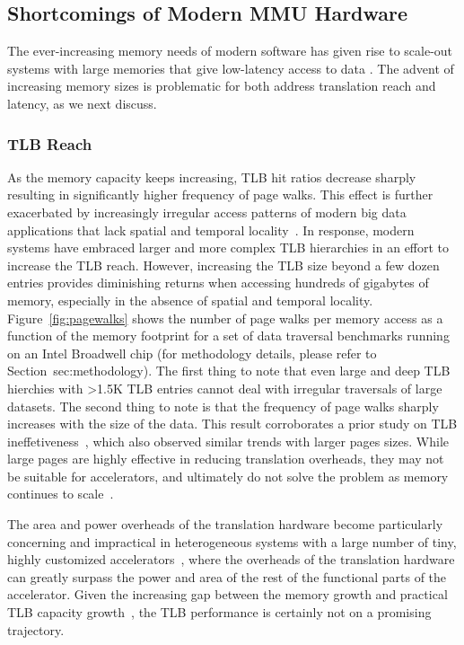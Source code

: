 \subsection{Shortcomings of Modern MMU Hardware}
The ever-increasing memory needs of modern software has given rise to
scale-out systems with large memories that give low-latency access to
data \cite{ferdman:clearing, karakostas:performance, volos:fat,
  basu:efficient}. The advent of increasing memory sizes is
problematic for both address translation reach and latency, as we next
discuss.

\subsubsection{TLB Reach}
As the memory capacity keeps increasing, TLB hit ratios decrease
sharply~\cite{basu:efficient} resulting in significantly higher
frequency of page walks. This effect is further exacerbated by
increasingly irregular access patterns of modern big data applications
that lack spatial and temporal
locality~\cite{haria:devirtualizing}. In response, modern systems have
embraced larger and more complex TLB hierarchies in an effort to
increase the TLB reach. However, increasing the TLB size beyond a few
dozen entries provides diminishing returns when accessing hundreds of
gigabytes of memory, especially in the absence of spatial and temporal
locality. Figure~\ref{fig:pagewalks} shows the number of page walks
per memory access as a function of the memory footprint for a set of
data traversal benchmarks running on an Intel Broadwell chip (for
methodology details, please refer to Section~{sec:methodology}). The
first thing to note that even large and deep TLB hierchies with >1.5K
TLB entries cannot deal with irregular traversals of large
datasets. The second thing to note is that the frequency of page walks
sharply increases with the size of the data. This result corroborates
a prior study on TLB ineffetiveness~\cite{basu:efficient}, which also
observed similar trends with larger pages sizes. While large pages are
highly effective in reducing translation overheads, they may not be
suitable for accelerators, and ultimately do not solve the problem as
memory continues to scale~\cite{basu:efficient}.

The area and power overheads of the translation hardware become particularly concerning and impractical in heterogeneous systems with a large number of tiny, highly customized accelerators~\cite{haria:devirtualizing}, where the overheads of the translation hardware can greatly surpass the power and area of the rest of the functional parts of the accelerator. Given the increasing gap between the memory growth and practical TLB capacity growth~\cite{gandhi:badgertrap}, the TLB performance is certainly not on a promising trajectory.


